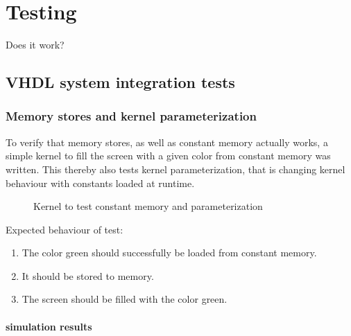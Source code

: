 \documentclass[../main/report.tex]{subfiles}
\begin{document}
\chapter{Testing}

Does it work?

\section{VHDL system integration tests}

\subsection{Memory stores and kernel parameterization}

To verify that memory stores, as well as constant memory actually works, a simple kernel to fill the screen with a given color from constant memory was written.
This thereby also tests kernel parameterization, that is changing kernel behaviour with constants loaded at runtime.

\begin{figure}[H]
  \caption{Kernel to test constant memory and parameterization}
  \label{fig:test-kernel-parameterization}
\end{figure}

Expected behaviour of test:
\begin{enumerate}
  \item
    The color green should successfully be loaded from constant memory.
  \item
    It should be stored to memory.
  \item
    The screen should be filled with the color green.
\end{enumerate}

\subsubsection*{simulation results}
\end{document}
